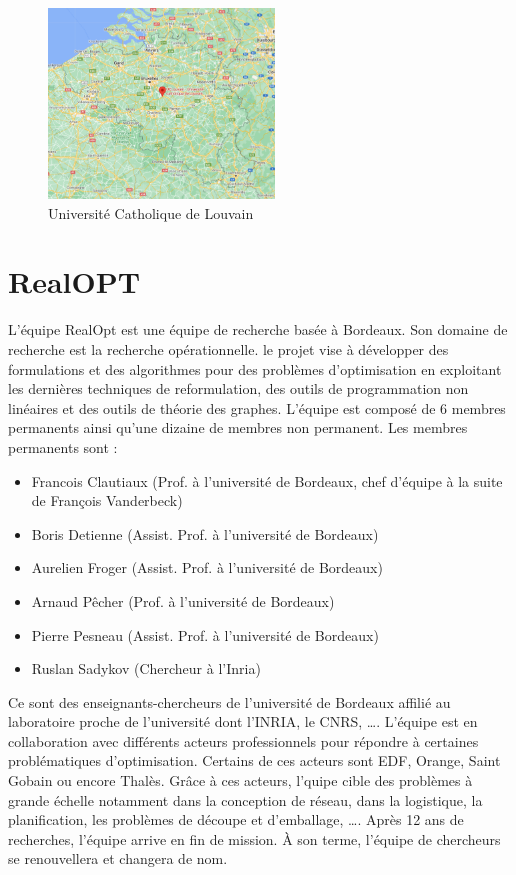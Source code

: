\documentclass[12pt]{article}
\begin{document}
    \begin{figure}
        \centering
        \includegraphics[width=6cm]{image/Map-UCLouvain.png}
        \caption{Université Catholique de Louvain}
        \label{fig:UC Louvain}
    \end{figure}

    \newpage
    \section{RealOPT}\label{sec:realopt}

    L'équipe RealOpt est une équipe de recherche basée à Bordeaux.
    Son domaine de recherche est la recherche opérationnelle.
    le projet vise à développer des formulations et des algorithmes pour des problèmes d'optimisation en exploitant les dernières techniques de reformulation, des outils de programmation non linéaires et des outils de théorie des graphes.
    L'équipe est composé de 6 membres permanents ainsi qu'une dizaine de membres non permanent.
    Les membres permanents sont :
    \begin{itemize}
        \item Francois Clautiaux  (Prof. à l'université de Bordeaux, chef d'équipe à la suite de
        François Vanderbeck)
        \item Boris Detienne (Assist. Prof. à l'université de Bordeaux)
        \item Aurelien Froger (Assist. Prof. à l'université de Bordeaux)
        \item Arnaud Pêcher (Prof. à l'université de Bordeaux)
        \item Pierre Pesneau (Assist. Prof. à l'université de Bordeaux)
        \item Ruslan Sadykov (Chercheur à l'Inria)
    \end{itemize}
    Ce sont des enseignants-chercheurs de l'université de Bordeaux affilié au laboratoire proche de l'université
    dont l'INRIA, le CNRS, \ldots .
    L'équipe est en collaboration avec différents acteurs professionnels pour répondre à certaines problématiques
    d'optimisation.
    Certains de ces acteurs sont EDF, Orange, Saint Gobain ou encore Thalès. Grâce à ces acteurs, l'quipe cible des problèmes à grande échelle notamment dans la conception de réseau, dans la logistique, la planification, les problèmes de découpe et d'emballage, \ldots .
    Après 12 ans de recherches, l'équipe arrive en fin de mission.
    À son terme, l'équipe de chercheurs se renouvellera et changera de nom.
\end{document}
